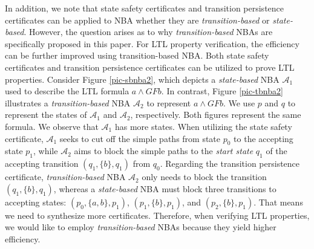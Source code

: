 \documentclass[acmlarge]{acmart}
\begin{document}

In addition, we note that state safety certificates and transition persistence certificates can be applied to NBA whether they are \emph{transition-based} or \emph{state-based}. However, the question arises as to why \emph{transition-based} NBAs are specifically proposed in this paper. For LTL property verification, the efficiency can be further improved using transition-based NBA. Both state safety certificates and transition persistence certificates can be utilized to prove LTL properties. Consider Figure \ref{pic-sbnba2}, which depicts a \emph{state-based} NBA $\mathcal{A}_1$ used to describe the LTL formula $a \land GFb$. In contrast, Figure \ref{pic-tbnba2} illustrates a \emph{transition-based} NBA $\mathcal{A}_2$ to represent $a \land GFb$. We use $p$ and $q$ to represent the states of $\mathcal{A}_1$ and $\mathcal{A}_2$, respectively. Both figures represent the same formula. We observe that $\mathcal{A}_1$ has more states. When utilizing the state safety certificate, $\mathcal{A}_1$ seeks to cut off the simple paths from state $p_0$ to the accepting state $p_1$, while $\mathcal{A}_2$ aims to block the simple paths to the \emph{start state} $q_1$ of the accepting transition $(q_1, \{b\}, q_1)$ from $q_0$. Regarding the transition persistence certificate, \emph{transition-based} NBA $\mathcal{A}_2$ only needs to block the transition $(q_1, \{b\}, q_1)$, whereas a \emph{state-based} NBA must block three transitions to accepting states: $(p_0, \{a, b\}, p_1)$, $(p_1, \{b\}, p_1)$, and $(p_2, \{b\}, p_1)$. That means we need to synthesize more certificates. Therefore, when verifying LTL properties, we would like to employ \emph{transition-based} NBAs because they yield higher efficiency.
\end{document}
